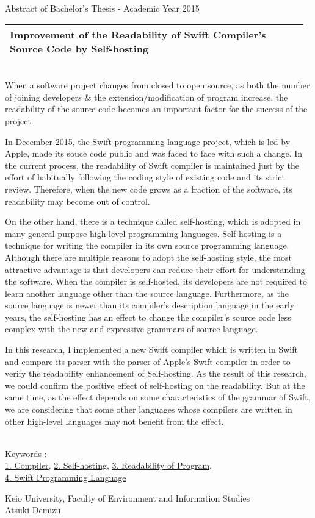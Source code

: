 Abstract of Bachelor's Thesis - Academic Year 2015
\begin{center}
\begin{large}
\begin{tabular}{|p{0.97\linewidth}|}
    \hline
    Improvement of the Readability of Swift Compiler's Source Code by Self-hosting\\
    \hline
\end{tabular}
\end{large}
\end{center}

~ \\

When a software project changes from closed to open source, as both the number of joining developers \& the extension/modification of program increase, the readability of the source code becomes an important factor for the success of the project.

In December 2015, the Swift programming language project, which is led by Apple, made its souce code public and was faced to face with such a change.
In the current process, the readability of Swift compiler is maintained just by the effort of habitually following the coding style of existing code and its strict review.
Therefore, when the new code grows as a fraction of the software, its readability may become out of control.

On the other hand, there is a technique called self-hosting, which is adopted in many general-purpose high-level programming languages.
Self-hosting is a technique for writing the compiler in its own source programming language.
Although there are multiple reasons to adopt the self-hosting style, the most attractive advantage is that developers can reduce their effort for understanding the software.
When the compiler is self-hosted, its developers are not required to learn another language other than the source language.
Furthermore, as the source language is newer than its compiler's description language in the early years, the self-hosting has an effect to change the compiler's source code less complex with the new and expressive grammars of source language.

In this research, I implemented a new Swift compiler which is written in Swift and compare its parser with the parser of Apple's Swift compiler in order to verify the readability enhancement of Self-hosting.
As the result of this research, we could confirm the positive effect of self-hosting on the readability.
But at the same time, as the effect depends on some characteristics of the  grammar of Swift, we are considering that some other languages whose compilers are written in other high-level languages may not benefit from the effect.

~ \\
Keywords : \\
\underline{1. Compiler},
\underline{2. Self-hosting},
\underline{3. Readability of Program},\\
\underline{4. Swift Programming Language}
\begin{flushright}
Keio University, Faculty of Environment and Information Studies\\
Atsuki Demizu
\end{flushright}
